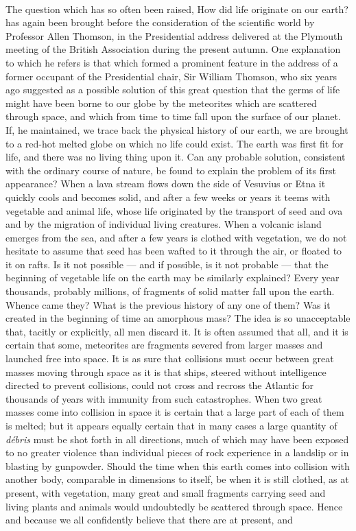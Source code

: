 \documentclass[a4paper, 11pt, oneside, english]{article}
\begin{document}
\paragraph{}
The question which has so often been raised, How did life originate on our earth? has again been brought before the consideration of the scientific world by Professor Allen Thomson, in the Presidential address delivered at the Plymouth meeting of the British Association during the present autumn. One explanation to which he refers is that which formed a prominent feature in the address of a former occupant of the Presidential chair, Sir William Thomson, who six years ago suggested as a possible solution of this great question that the germs of life might have been borne to our globe by the meteorites which are scattered through space, and which from time to time fall upon the surface of our planet. If, he maintained, we trace back the physical history of our earth, we are brought to a red-hot melted globe on which no life could exist. The earth was first fit for life, and there was no living thing upon it. Can any probable solution, consistent with the ordinary course of nature, be found to explain the problem of its first appearance? When a lava stream flows down the side of Vesuvius or Etna it quickly cools and becomes solid, and after a few weeks or years it teems with vegetable and animal life, whose life originated by the transport of seed and ova and by the migration of individual living creatures. When a volcanic island emerges from the sea, and after a few years is clothed with vegetation, we do not hesitate to assume that seed has been wafted to it through the air, or floated to it on rafts. Is it not possible --- and if possible, is it not probable --- that the beginning of vegetable life on the earth may be similarly explained? Every year thousands, probably millions, of fragments of solid matter fall upon the earth. Whence came they? What is the previous history of any one of them? Was it created in the beginning of time an amorphous mass? The idea is so unacceptable that, tacitly or explicitly, all men discard it. It is often assumed that all, and it is certain that some, meteorites are fragments severed from larger masses and launched free into space. It is as sure that collisions must occur between great masses moving through space as it is that ships, steered without intelligence directed to prevent collisions, could not cross and recross the Atlantic for thousands of years with immunity from such catastrophes. When two great masses come into collision in space it is certain that a large part of each of them is melted; but it appears equally certain that in many cases a large quantity of \emph{débris} must be shot forth in all directions, much of which may have been exposed to no greater violence than individual pieces of rock experience in a landslip or in blasting by gunpowder. Should the time when this earth comes into collision with another body, comparable in dimensions to itself, be when it is still clothed, as at present, with vegetation, many great and small fragments carrying seed and living plants and animals would undoubtedly be scattered through space. Hence and because we all confidently believe that there are at present, and 
\end{document}
